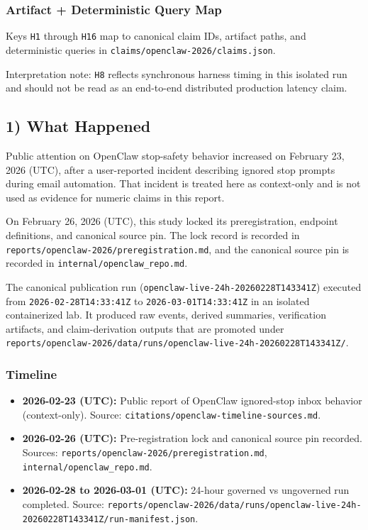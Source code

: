 \documentclass[
]{article}
\providecommand{\tightlist}{%
  \setlength{\itemsep}{0pt}\setlength{\parskip}{0pt}}
\begin{document}
\subsubsection{Artifact + Deterministic Query
Map}\label{artifact--deterministic-query-map}

Keys \texttt{H1} through \texttt{H16} map to canonical claim IDs,
artifact paths, and deterministic queries in
\texttt{claims/openclaw-2026/claims.json}.

Interpretation note: \texttt{H8} reflects synchronous harness timing in
this isolated run and should not be read as an end-to-end distributed
production latency claim.

\subsection{1) What Happened}\label{1-what-happened}

Public attention on OpenClaw stop-safety behavior increased on February
23, 2026 (UTC), after a user-reported incident describing ignored stop
prompts during email automation. That incident is treated here as
context-only and is not used as evidence for numeric claims in this
report.

On February 26, 2026 (UTC), this study locked its preregistration,
endpoint definitions, and canonical source pin. The lock record is
recorded in \texttt{reports/openclaw-2026/preregistration.md}, and the
canonical source pin is recorded in \texttt{internal/openclaw\_repo.md}.

The canonical publication run
(\texttt{openclaw-live-24h-20260228T143341Z}) executed from
\texttt{2026-02-28T14:33:41Z} to \texttt{2026-03-01T14:33:41Z} in an
isolated containerized lab. It produced raw events, derived summaries,
verification artifacts, and claim-derivation outputs that are promoted
under
\texttt{reports/openclaw-2026/data/runs/openclaw-live-24h-20260228T143341Z/}.

\subsubsection{Timeline}\label{timeline}

\begin{itemize}
\tightlist
\item
  \textbf{2026-02-23 (UTC):} Public report of OpenClaw ignored-stop
  inbox behavior (context-only). Source:
  \texttt{citations/openclaw-timeline-sources.md}.
\item
  \textbf{2026-02-26 (UTC):} Pre-registration lock and canonical source
  pin recorded. Sources:
  \texttt{reports/openclaw-2026/preregistration.md},
  \texttt{internal/openclaw\_repo.md}.
\item
  \textbf{2026-02-28 to 2026-03-01 (UTC):} 24-hour governed vs
  ungoverned run completed. Source:
  \texttt{reports/openclaw-2026/data/runs/openclaw-live-24h-20260228T143341Z/run-manifest.json}.
\end{itemize}
\end{document}

